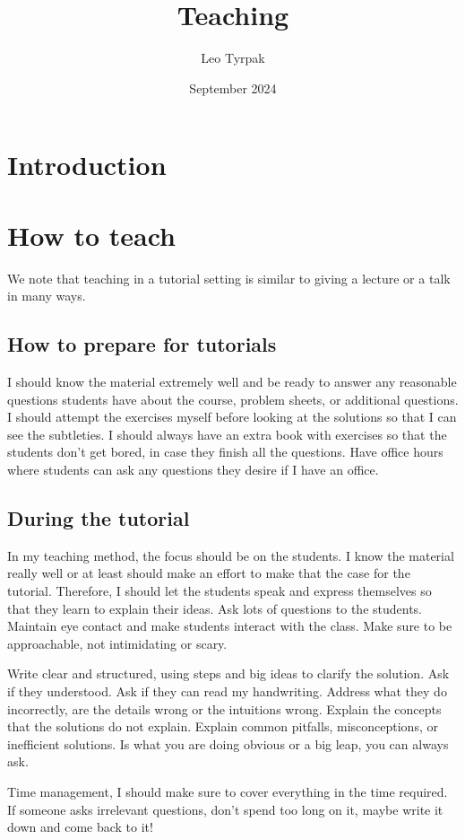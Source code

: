 \documentclass{article}
\title{Teaching}
\author{Leo Tyrpak}
\date{September 2024}
\begin{document}
\maketitle

\section{Introduction}
\section{How to teach}
We note that teaching in a tutorial setting is similar to giving a lecture or a talk in many ways. 
\subsection{How to prepare for tutorials}
I should know the material extremely well and be ready to answer any reasonable questions students have about the course, problem sheets, or additional questions.
I should attempt the exercises myself before looking at the solutions so that I can see the subtleties.
I should always have an extra book with exercises so that the students don't get bored, in case they finish all the questions.
Have office hours where students can ask any questions they desire if I have an office.
\subsection{During the tutorial}
In my teaching method, the focus should be on the students.
I know the material really well or at least should make an effort to make that the case for the tutorial.
Therefore, I should let the students speak and express themselves so that they learn to explain their ideas.
Ask lots of questions to the students.
Maintain eye contact and make students interact with the class.
Make sure to be approachable, not intimidating or scary.

Write clear and structured, using steps and big ideas to clarify the solution.
Ask if they understood.
Ask if they can read my handwriting.
Address what they do incorrectly, are the details wrong or the intuitions wrong.
Explain the concepts that the solutions do not explain.
Explain common pitfalls, misconceptions, or inefficient solutions.
Is what you are doing obvious or a big leap, you can always ask.

Time management, I should make sure to cover everything in the time required.
If someone asks irrelevant questions, don't spend too long on it, maybe write it down and come back to it!
\end{document}
